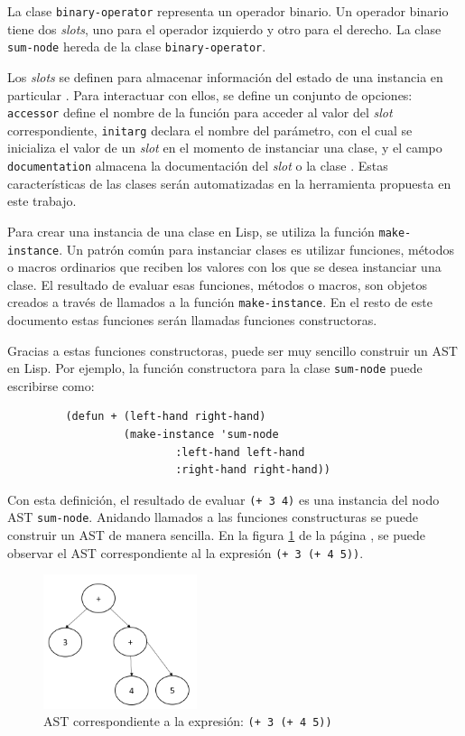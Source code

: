 La clase \texttt{binary-operator} representa un operador binario. Un operador binario tiene dos \textit{slots}, uno para el operador izquierdo y otro para el derecho. La clase \texttt{sum-node} hereda de la clase \texttt{binary-operator}.

Los \textit{slots} se definen para almacenar información del estado de una instancia en particular \cite{successful-lisp}. Para interactuar con ellos, se define un conjunto de opciones: \texttt{accessor} define el nombre de la función para acceder al valor del \textit{slot} correspondiente, \texttt{initarg} declara el nombre del parámetro, con el cual se inicializa el valor de un \textit{slot} en el momento de instanciar una clase, y el campo \texttt{documentation} almacena la documentación del \textit{slot} o la clase \cite{sonya}. Estas características de las clases serán automatizadas en la herramienta propuesta en este trabajo.

\label{Funciones constructoras}
Para crear una instancia de una clase en Lisp, se utiliza la función \texttt{make-instance}\cite{sonya}. Un patrón común para instanciar clases es utilizar funciones, métodos o macros ordinarios que reciben los valores con los que se desea instanciar una clase. El resultado de evaluar esas funciones, métodos o macros, son objetos creados a través de llamados a la función \texttt{make-instance}. En el resto de este documento estas funciones serán llamadas funciones constructoras.

Gracias a estas funciones constructoras, puede ser muy sencillo construir un AST en Lisp. Por ejemplo, la función constructora para la clase \texttt{sum-node} puede escribirse como:

\begin{verbatim}
         (defun + (left-hand right-hand)
                  (make-instance 'sum-node
                          :left-hand left-hand
                          :right-hand right-hand))
\end{verbatim}
Con esta definición, el resultado de evaluar \texttt{(+ 3 4)} es una instancia del nodo AST \texttt{sum-node}. Anidando llamados a las funciones constructuras se puede construir un AST de manera sencilla. En la figura \ref{AS2} de la página \pageref{AS2}, se puede observar el AST correspondiente al la expresión \texttt{(+ 3 (+ 4 5))}.

\begin{figure}
	\centering
	\includegraphics[width=0.4\textwidth]{AST2.png}
	\caption{AST correspondiente a la expresión: \texttt{(+ 3 (+ 4 5))}}
	\label{AS2}
\end{figure}

